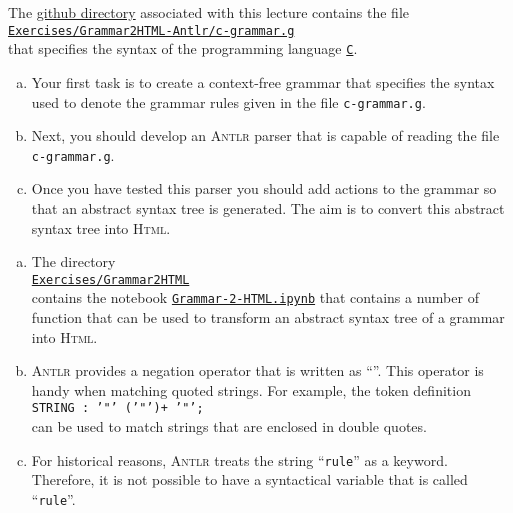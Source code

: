 \exerciseEng
The \href{https://github.com/karlstroetmann/Formal-Languages}{github directory} associated with this lecture
contains the file
\\[0.2cm]
\hspace*{1.3cm}
\href{https://github.com/karlstroetmann/Formal-Languages/tree/master/Exercises/Grammar2HTML-Antlr/c-grammar.g}{
\texttt{Exercises/Grammar2HTML-Antlr/c-grammar.g}}
\\[0.2cm]
that specifies the syntax of the programming language 
\href{https://en.wikipedia.org/wiki/C_(programming_language)}{\texttt{C}}.

\begin{enumerate}[(a)]
\item Your first task is to create a context-free grammar that specifies the syntax used to denote the grammar
      rules given in the file \texttt{c-grammar.g}.  
\item Next, you should develop an \textsc{Antlr} parser that is capable of reading the file
      \texttt{c-grammar.g}.
\item Once you have tested this parser you should add actions to the grammar
      so that an abstract syntax tree is generated.  The aim is to convert this abstract syntax tree
      into \textsc{Html}. 
\end{enumerate}

\remarkEng
\begin{enumerate}[(a)]
\item The directory 
      \\[0.2cm]
      \hspace*{1.3cm}
      \href{https://github.com/karlstroetmann/Formal-Languages/tree/master/Exercises/Grammar2HTML/}{\texttt{Exercises/Grammar2HTML}}
      \\[0.2cm]
      contains the notebook      
      \href{https://github.com/karlstroetmann/Formal-Languages/tree/master/Exercises/Grammar2HTML/Grammar-2-HTML.ipynb}{\texttt{Grammar-2-HTML.ipynb}}
      that contains a number of function that can be used to transform an abstract syntax tree of a grammar
      into \textsc{Html}.
\item \textsc{Antlr} provides a negation operator that is written as ``\texttt{}''.
      This operator is handy when matching quoted strings.  For example, the token definition
      \\[0.2cm]
      \hspace*{1.3cm}
      \texttt{STRING : '"' ('"')+ '"';}
      \\[0.2cm]
      can be used to match strings that are enclosed in double quotes.
\item For historical reasons, \textsc{Antlr} treats the string ``\texttt{rule}'' as a 
      keyword.  Therefore, it is not possible to have a syntactical variable that is called
      ``\texttt{rule}''. 
\end{enumerate}

